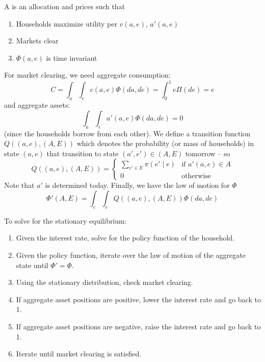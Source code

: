 \documentclass[10pt]{article}
\begin{document}
\begin{definition}
	A  is an allocation and prices such that 
	\begin{enumerate}
		\item Households maximize utility per $v(a,e)$, $a'(a,e)$
		\item Markets clear
		\item $\Phi(a,e)$ is time invariant
	\end{enumerate}

For market clearing, we need aggregate consumption: \[C = \int_a \int_e c(a,e) \Phi(da,de) = \int_0^1 e \Pi(de) = e\]and aggregate assets: \[\int_a \int_e a'(a,e) \Phi(da,de) = 0\](since the households borrow from each other). We define a transition function $Q((a,e),(A,E))$ which denotes the probability (or mass of households) in state $(a,e)$ that transition to state $(a',e') \in (A,E)$ tomorrow -- so \[Q((a,e),(A,E)) = \begin{cases} \sum_{e' \in E} \pi(e'\mid e) &\text{if } a'(a,e) \in A \\ 0 &\text{otherwise} \end{cases}\]Note that $a'$ is determined today. Finally, we have the law of motion for $\Phi$ \[\Phi'(A,E) = \int_e \int_e Q((a,e),(A,E)) \Phi(da,de)\]
\end{definition}

\begin{algorithm}
	To solve for the stationary equilibrium:
	\begin{enumerate}
		\item Given the interest rate, solve for the policy function of the household.
		\item Given the policy function, iterate over the law of motion of the aggregate state until $\Phi' = \Phi$.
		\item Using the stationary distribution, check market clearing.
		\item If aggregate asset positions are positive, lower the interest rate and go back to 1.
		\item If aggregate asset positions are negative, raise the interest rate and go back to 1.
		\item Iterate until market clearing is satisfied.
	\end{enumerate}
\end{algorithm}
\end{document}
